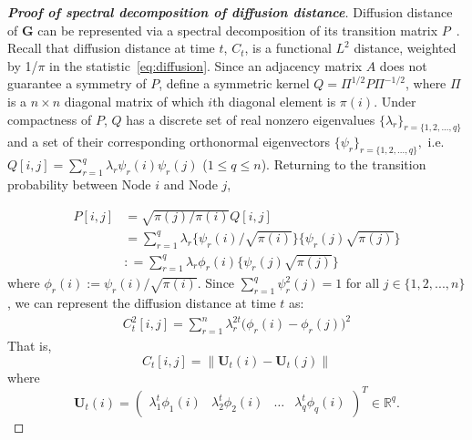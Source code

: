 \documentclass[12pt]{article}
\theoremstyle{definition}
\begin{document}
\begin{proof}[\textbf{Proof of spectral decomposition of diffusion distance}]
	Diffusion distance of $\mathbf{G}$ can be represented via a spectral decomposition of its transition matrix $P$~\citep{coifman2006diffusion,lafon2006diffusion}. Recall that diffusion distance at time $t$, $C_{t}$, is a functional $L^2$ distance, weighted by 1/$\pi$ in the statistic~\ref{eq:diffusion}. Since an adjacency matrix $A$ does not guarantee a symmetry of $P$, define a symmetric kernel $Q = \Pi^{1/2} P \Pi^{-1/2}$, where $\Pi$ is a $n \times n$ diagonal matrix of which $i$th diagonal element is $\pi(i)$. Under compactness of $P$, $Q$ has a discrete set of real nonzero eigenvalues $\{ \lambda_{r} \}_{r = \{1,2,...,q \}}$ and a set of their corresponding orthonormal eigenvectors $\{ \psi_{r} \}_{r = \{1,2,..., q \} },$ i.e. $Q[i,j] = \sum\limits_{r=1}^{q} \lambda_{r} \psi_{r}(i) \psi_{r}(j)$ ($1 \leq q \leq n$). Returning to the transition probability between Node $i$ and Node $j$,
	
	\begin{equation}
	\begin{split}
	P[i,j] &  = \sqrt{\pi(j) / \pi(i) } Q[i,j] \\ &   = \sum\limits_{r=1}^{q} \lambda_{r} \big\{ \psi_{r}(i) / \sqrt{\pi(i)}  \big\} \big\{ \psi_{r}(j) \sqrt{\pi(j)} \big\}  \\ & : = \sum\limits_{r=1}^{q} \lambda_{r} \phi_{r}(i) \big\{ \psi_{r}(j) \sqrt{\pi(j)} \big\}
	\end{split}
	\end{equation}
	where $\phi_{r}(i) := \psi_{r}(i) / \sqrt{\pi(i)}$. Since $\sum\limits_{r=1}^{q} \psi^2_{r}(j) = 1$ for all $j \in \{1,2,...,n\}$, we can represent the diffusion distance at time $t$ as: 	
	\begin{equation}
	\begin{split}
	C^2_{t}[i,j]  = \sum\limits_{r=1}^{n} \lambda^{2t}_{r} \big( \phi_{r} (i) - \phi_{r}(j)   \big)^2  
	\end{split}
	\end{equation}
	That is,
	\begin{equation}
	C_{t}[i,j] = \parallel \mathbf{U}_{t}(i) - \mathbf{U}_{t}(j) \parallel
	\end{equation}
	where 
	\begin{equation} 
	\mathbf{U}_{t}(i) = \begin{pmatrix} \lambda^{t}_{1} \phi_{1}(i) & \lambda^{t}_{2} \phi_{2} (i)  & \ldots & \lambda^{t}_{q} \phi_{q}(i) \end{pmatrix}^{T} \in \mathbb{R}^{q}.
	\end{equation}
	
\end{proof}	
	
\end{document}
